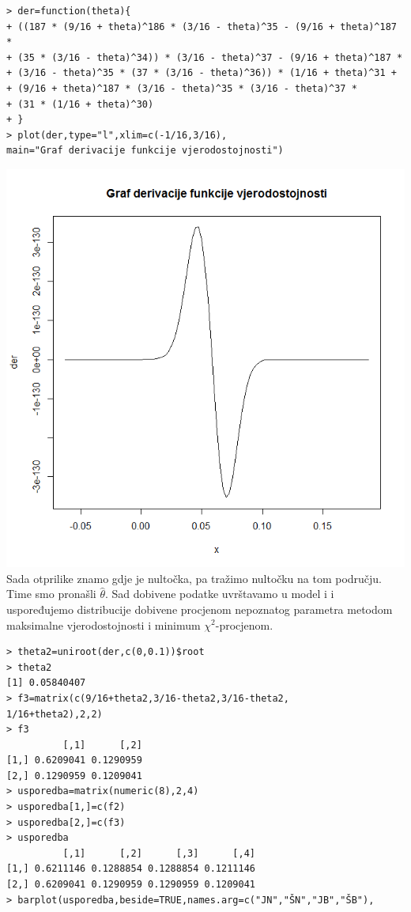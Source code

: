 \documentclass[11pt]{article}
\begin{document}
\begin{enumerate}[(a)]
\begin{verbatim}
> der=function(theta){
+ ((187 * (9/16 + theta)^186 * (3/16 - theta)^35 - (9/16 + theta)^187 * 
+ (35 * (3/16 - theta)^34)) * (3/16 - theta)^37 - (9/16 + theta)^187 * 
+ (3/16 - theta)^35 * (37 * (3/16 - theta)^36)) * (1/16 + theta)^31 + 
+ (9/16 + theta)^187 * (3/16 - theta)^35 * (3/16 - theta)^37 * 
+ (31 * (1/16 + theta)^30)
+ }
> plot(der,type="l",xlim=c(-1/16,3/16),
main="Graf derivacije funkcije vjerodostojnosti")
\end{verbatim}
\includegraphics[scale=0.4]{5.png}\\
Sada otprilike znamo gdje je nultočka, pa tražimo nultočku na tom području. Time smo pronašli $\hat{\theta}$. Sad dobivene podatke uvrštavamo u model i i uspoređujemo distribucije dobivene procjenom nepoznatog parametra metodom maksimalne vjerodostojnosti i minimum $\chi^2$-procjenom.
\begin{verbatim}
> theta2=uniroot(der,c(0,0.1))$root
> theta2
[1] 0.05840407
> f3=matrix(c(9/16+theta2,3/16-theta2,3/16-theta2,
1/16+theta2),2,2)
> f3
          [,1]      [,2]
[1,] 0.6209041 0.1290959
[2,] 0.1290959 0.1209041
> usporedba=matrix(numeric(8),2,4)
> usporedba[1,]=c(f2)
> usporedba[2,]=c(f3)
> usporedba
          [,1]      [,2]      [,3]      [,4]
[1,] 0.6211146 0.1288854 0.1288854 0.1211146
[2,] 0.6209041 0.1290959 0.1290959 0.1209041
> barplot(usporedba,beside=TRUE,names.arg=c("JN","ŠN","JB","ŠB"),

\end{verbatim}
\end{enumerate}
\end{document}
